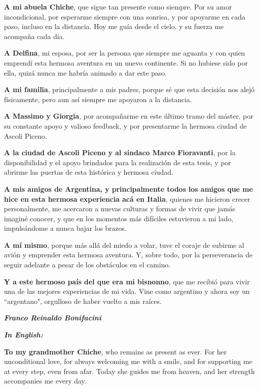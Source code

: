 \documentclass[a4paper, 12pt, twoside]{report}  %
\begin{document}
\textbf{A mi abuela Chiche}, que sigue tan presente como siempre. Por su amor incondicional, por esperarme siempre con una sonrisa, y por apoyarme en cada paso, incluso en la distancia. Hoy me guía desde el cielo, y su fuerza me acompaña cada día.

\textbf{A Delfina}, mi esposa, por ser la persona que siempre me aguanta y con quien emprendí esta hermosa aventura en un nuevo continente. Si no hubiese sido por ella, quizá nunca me habría animado a dar este paso.

\textbf{A mi familia}, principalmente a mis padres, porque sé que esta decisión nos alejó físicamente, pero aun así siempre me apoyaron a la distancia.

\textbf{A Massimo y Giorgia}, por acompañarme en este último tramo del máster, por su constante apoyo y valioso feedback, y por presentarme la hermosa ciudad de Ascoli Piceno.

\textbf{A la ciudad de Ascoli Piceno y al sindaco Marco Fioravanti}, por la disponibilidad y el apoyo brindados para la realización de esta tesis, y por abrirme las puertas de esta histórica y hermosa ciudad.

\textbf{A mis amigos de Argentina, y principalmente todos los amigos que me hice en esta hermosa experiencia acá en Italia}, quienes me hicieron crecer personalmente, me acercaron a nuevas culturas y formas de vivir que jamás imaginé conocer, y que en los momentos más difíciles estuvieron a mi lado, impulsándome a nunca bajar los brazos.

\textbf{A mí mismo}, porque más allá del miedo a volar, tuve el coraje de subirme al avión y emprender esta hermosa aventura. Y, sobre todo, por la perseverancia de seguir adelante a pesar de los obstáculos en el camino.

\textbf{Y a este hermoso país del que era mi bisnonno}, que me recibió para vivir una de las mejores experiencias de mi vida. Vine como argentino y ahora soy un ``argentano", orgulloso de haber vuelto a mis raíces.

\begin{flushright}
    \textbf{\textit{Franco Reinaldo Bonifacini}}\\[0.1cm]
\end{flushright}

\newpage
\textbf{\textit{In English:}}

\textbf{To my grandmother Chiche}, who remains as present as ever. For her unconditional love, for always welcoming me with a smile, and for supporting me at every step, even from afar. Today she guides me from heaven, and her strength accompanies me every day.
\end{document}
